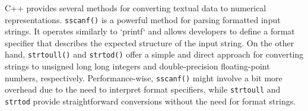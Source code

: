 C++ provides several methods for converting textual data to numerical representations. \texttt{sscanf()} is a powerful method for parsing formatted input strings. It operates similarly to `printf` and allows developers to define a format specifier that describes the expected structure of the input string. On the other hand, \texttt{strtoull()} and \texttt{strtod()} offer a simple and direct approach for converting strings to unsigned long long integers and double-precision floating-point numbers, respectively. Performance-wise, \texttt{sscanf()} might involve a bit more overhead due to the need to interpret format specifiers, while \texttt{strtoull} and \texttt{strtod} provide straightforward conversions without the need for format strings.
